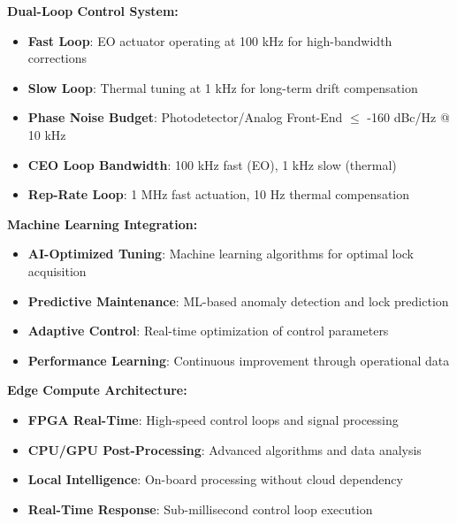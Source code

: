 \documentclass[11pt,a4paper]{article}
\begin{document}
\textbf{Dual-Loop Control System:}
\begin{itemize}
\item \textbf{Fast Loop}: EO actuator operating at 100 kHz for high-bandwidth corrections
\item \textbf{Slow Loop}: Thermal tuning at 1 kHz for long-term drift compensation
\item \textbf{Phase Noise Budget}: Photodetector/Analog Front-End $\leq$ -160 dBc/Hz @ 10 kHz
\item \textbf{CEO Loop Bandwidth}: 100 kHz fast (EO), 1 kHz slow (thermal)
\item \textbf{Rep-Rate Loop}: 1 MHz fast actuation, 10 Hz thermal compensation
\end{itemize}

\textbf{Machine Learning Integration:}
\begin{itemize}
\item \textbf{AI-Optimized Tuning}: Machine learning algorithms for optimal lock acquisition
\item \textbf{Predictive Maintenance}: ML-based anomaly detection and lock prediction
\item \textbf{Adaptive Control}: Real-time optimization of control parameters
\item \textbf{Performance Learning}: Continuous improvement through operational data
\end{itemize}

\textbf{Edge Compute Architecture:}
\begin{itemize}
\item \textbf{FPGA Real-Time}: High-speed control loops and signal processing
\item \textbf{CPU/GPU Post-Processing}: Advanced algorithms and data analysis
\item \textbf{Local Intelligence}: On-board processing without cloud dependency
\item \textbf{Real-Time Response}: Sub-millisecond control loop execution
\end{itemize}
\end{document}

